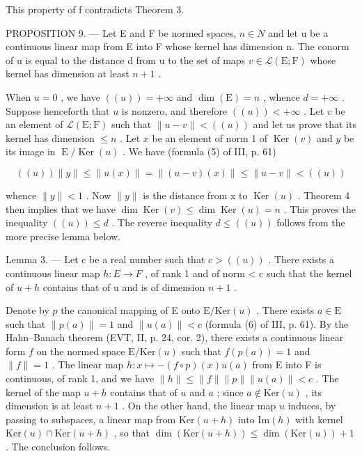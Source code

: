 This property of f contradicts Theorem 3.

PROPOSITION 9. — Let E and F be normed spaces, \(n \in N\) and let u be a continuous linear map from E into F whose kernel has dimension n. The conorm of u is equal to the distance d from u to the set of maps \(v \in \mathcal{L}(\mathrm{E};\mathrm{F})\) whose kernel has dimension at least \(n + 1\) .

When \(u = 0\) , we have \(((u)) = +\infty\) and \(\dim(\mathrm{E}) = n\) , whence \(d = +\infty\) . Suppose henceforth that \(u\) is nonzero, and therefore \(((u)) < +\infty\) . Let \(v\) be an element of \(\mathcal{L}(\mathrm{E};\mathrm{F})\) such that \(\| u - v \| < ((u))\) and let us prove that its kernel has dimension \(\leqslant n\) . Let \(x\) be an element of norm 1 of \(\operatorname{Ker}(v)\) and \(y\) be its image in \(\operatorname{E}/\operatorname{Ker}(u)\) . We have (formula (5) of III, p. 61)

\[
((u)) \| y \| \leqslant \| u (x) \| = \| (u - v) (x) \| \leqslant \| u - v \| <   ((u))
\]

whence \(\|y\| < 1\) . Now \(\|y\|\) is the distance from x to \(\operatorname{Ker}(u)\) . Theorem 4 then implies that we have \(\dim \operatorname{Ker}(v) \leqslant \dim \operatorname{Ker}(u) = n\) . This proves the inequality \(((u)) \leqslant d\) . The reverse inequality \(d \leqslant ((u))\) follows from the more precise lemma below.

Lemma 3. — Let c be a real number such that \(c > ((u))\) . There exists a continuous linear map \(h: E \to F\) , of rank 1 and of norm \textless{} c such that the kernel of \(u + h\) contains that of u and is of dimension \(n + 1\) .

Denote by \(p\) the canonical mapping of E onto \(\mathrm{E} / \mathrm{Ker}(u)\) . There exists \(a \in \mathrm{E}\) such that \(\| p(a) \| = 1\) and \(\| u(a) \| < c\) (formula (6) of III, p. 61). By the Hahn--Banach theorem (EVT, II, p. 24, cor. 2), there exists a continuous linear form \(f\) on the normed space \(\mathrm{E} / \mathrm{Ker}(u)\) such that \(f(p(a)) = 1\) and \(\| f \| = 1\) . The linear map \(h: x \mapsto -(f \circ p)(x)u(a)\) from E into F is continuous, of rank 1, and we have \(\| h \| \leqslant \| f \| \| p \| \| u(a) \| < c\) . The kernel of the map \(u + h\) contains that of \(u\) and \(a\) ; since \(a \notin \mathrm{Ker}(u)\) , its dimension is at least \(n + 1\) . On the other hand, the linear map \(u\) induces, by passing to subspaces, a linear map from \(\mathrm{Ker}(u + h)\) into \(\mathrm{Im}(h)\) with kernel \(\mathrm{Ker}(u) \cap \mathrm{Ker}(u + h)\) , so that \(\dim(\mathrm{Ker}(u + h)) \leqslant \dim(\mathrm{Ker}(u)) + 1\) . The conclusion follows.

